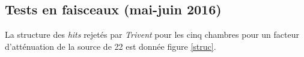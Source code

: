\subsection{Tests en faisceaux (mai-juin 2016)}
\label{GIFFF2}
La structure des \textit{hits} rejetés par \textit{Trivent} pour les cinq chambres pour un facteur d'atténuation de la source de \num{22} est donnée figure \ref{struc}.
\begin{figure}[ht!]
	\centering
	\hfill
	\\
	\vspace{0.7cm}
	\hfill
	\\
	\vspace{0.7cm}

\end{figure}

